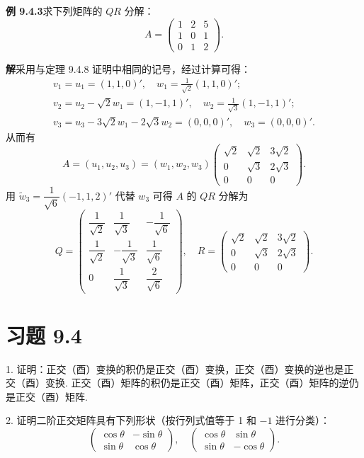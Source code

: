 \documentclass[UTF8, 12pt, fontset=fandol, oneside]{ctexart}
\begin{document}
\noindent\textbf{例 9.4.3}\quad 求下列矩阵的 $QR$ 分解：
\[
  A=
  \left(\begin{array}{ccc}
    1 & 2 & 5\\
    1 & 0 & 1\\
    0 & 1 & 2
  \end{array}\right).
\]

\noindent\textbf{解}\quad 采用与定理 9.4.8 证明中相同的记号，经过计算可得：
\[
\begin{gathered}
  v_1=u_1=(1,1,0)',\quad w_1=\frac1{\sqrt2}(1,1,0)';\\
  v_2=u_2-\sqrt2w_1=(1,-1,1)',\quad w_2=\frac1{\sqrt3}(1,-1,1)';\\
  v_3=u_3-3\sqrt2w_1-2\sqrt3w_2=(0,0,0)',\quad w_3=(0,0,0)'.
\end{gathered}
\]
从而有
\[
  A=(u_1,u_2,u_3)=(w_1,w_2,w_3)
  \left(\begin{array}{ccc}
    \sqrt2 & \sqrt2 & 3\sqrt2\\
    0 & \sqrt3 & 2\sqrt3\\
    0 & 0 & 0
  \end{array}\right).
\]
用 $\widetilde w_3=\dfrac1{\sqrt6}(-1,1,2)'$ 代替 $w_3$ 可得 $A$ 的 $QR$ 分解为
\[
  Q=
  \left(\begin{array}{ccc}
    \dfrac1{\sqrt2} & \dfrac1{\sqrt3} & -\dfrac1{\sqrt6}\\
    \dfrac1{\sqrt2} & -\dfrac1{\sqrt3} & \dfrac1{\sqrt6}\\
    0 & \dfrac1{\sqrt3} & \dfrac2{\sqrt6}
  \end{array}\right),
  \quad
  R=
  \left(\begin{array}{ccc}
    \sqrt2 & \sqrt2 & 3\sqrt2\\
    0 & \sqrt3 & 2\sqrt3\\
    0 & 0 & 0
  \end{array}\right).
\]

\section*{习题 9.4}

1. 证明：正交（酉）变换的积仍是正交（酉）变换，正交（酉）变换的逆也是正交（酉）变换. 正交（酉）矩阵的积仍是正交（酉）矩阵，正交（酉）矩阵的逆仍是正交（酉）矩阵.

2. 证明二阶正交矩阵具有下列形状（按行列式值等于 1 和 $-1$ 进行分类）：
\[
  \left(\begin{array}{cc}
    \cos\theta & -\sin\theta\\
    \sin\theta & \cos\theta
  \end{array}\right),
  \quad
  \left(\begin{array}{cc}
    \cos\theta & \sin\theta\\
    \sin\theta & -\cos\theta
  \end{array}\right).
\]
\end{document}
